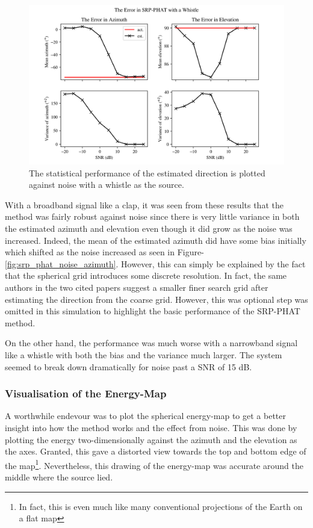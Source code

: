 \documentclass[notitlepage]{report}
\begin{document}
\begin{figure}[H]
\includegraphics[width=1\textwidth]{../Python/srp_phat/noise/whistle/plots.png}
\centering
\caption{The statistical performance of the estimated direction is plotted against noise with a whistle as the source.}
\label{fig:srp_phat_noise_whistle}
\centering
\end{figure}

With a broadband signal like a clap, it was seen from these results that the method was fairly robust against noise since there is very little variance in both the estimated azimuth and elevation even though it did grow as the noise was increased. Indeed, the mean of the estimated azimuth did have some bias initially which shifted as the noise increased as seen in Figure-\ref{fig:srp_phat_noise_azimuth}. However, this can simply be explained by the fact that the spherical grid introduces some discrete resolution. In fact, the same authors in the two cited papers \cite{valin_localization_2004} \cite{valin_robust_2007} suggest a smaller finer search grid after estimating the direction from the coarse grid. However, this was optional step was omitted in this simulation to highlight the basic performance of the SRP-PHAT method.

On the other hand, the performance was much worse with a narrowband signal like a whistle with both the bias and the variance much larger. The system seemed to break down dramatically for noise past a SNR of 15 \si{dB}. 

\subsubsection{Visualisation of the Energy-Map}

A worthwhile endevour was to plot the spherical energy-map to get a better insight into how the method works and the effect from noise. This was done by plotting the energy two-dimensionally against the azimuth and the elevation as the axes. Granted, this gave a distorted view towards the top and bottom edge of the map\footnote{In fact, this is even much like many conventional projections of the Earth on a flat map}. Nevertheless, this drawing of the energy-map was accurate around the middle where the source lied.
\end{document}
